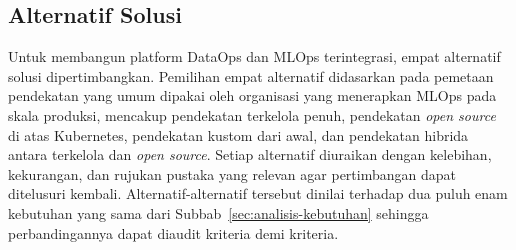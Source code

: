 \subsection{Alternatif Solusi}
\label{subsec:alternatif-solusi}

Untuk membangun platform DataOps dan MLOps terintegrasi, empat alternatif solusi dipertimbangkan. Pemilihan empat alternatif didasarkan pada pemetaan pendekatan yang umum dipakai oleh organisasi yang menerapkan MLOps pada skala produksi, mencakup pendekatan terkelola penuh, pendekatan \textit{open source} di atas Kubernetes, pendekatan kustom dari awal, dan pendekatan hibrida antara terkelola dan \textit{open source}. Setiap alternatif diuraikan dengan kelebihan, kekurangan, dan rujukan pustaka yang relevan agar pertimbangan dapat ditelusuri kembali. Alternatif-alternatif tersebut dinilai terhadap dua puluh enam kebutuhan yang sama dari Subbab~\ref{sec:analisis-kebutuhan} sehingga perbandingannya dapat diaudit kriteria demi kriteria.

